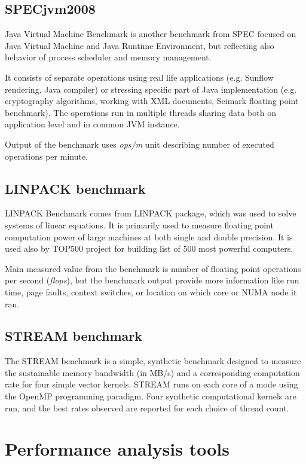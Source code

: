 \subsection{SPECjvm2008}
Java Virtual Machine Benchmark\;\cite{jvm2008} is another benchmark from SPEC
focused on Java Virtual Machine and Java Runtime Environment, but reflecting
also behavior of process scheduler and memory management.

It consists of separate operations using real life applications (e.g. Sunflow
rendering, Java compiler) or stressing specific part of Java implementation
(e.g. cryptography algorithms, working with XML documents, Scimark floating
point benchmark). The operations run in multiple threads sharing data both on
application level and in common JVM instance.

Output of the benchmark uses \emph{ops/m} unit describing number of executed
operations per minute.

\subsection{LINPACK benchmark}
LINPACK Benchmark\cite{linpack} comes from LINPACK package, which was used to
solve systems of linear equations. It is primarily
used to measure floating point computation power of large machines at both
single and double precision. It is used also by TOP500 project for building list
of 500 most powerful computers.

Main measured value from the benchmark is number of floating point operations per
second (\emph{flops}), but the benchmark output provide more information like
run time, page faults, context switches, or location on which core or NUMA node
it ran.

\subsection{STREAM benchmark}
The STREAM benchmark is a simple, synthetic benchmark designed to measure the sustainable memory bandwidth (in MB/s) and a corresponding computation rate for four simple vector kernels.
STREAM runs on each core of a mode using the OpenMP programming paradigm. Four synthetic computational kernels are run, and the best rates observed are reported for each choice of thread count.

\section{Performance analysis tools}

